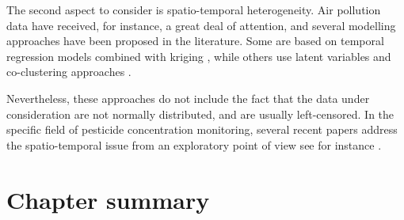 The second aspect to consider is spatio-temporal heterogeneity. Air pollution data have received, for instance, a great deal of attention, and several modelling approaches have been proposed in the literature. Some are based on temporal regression models combined with kriging \citep{sampson2011,lindstrom2014flexible}, while others use latent variables and co-clustering approaches \citep{bouveyron2021co}. 

Nevertheless, these approaches do not include the fact that the data under consideration are not normally distributed, and are usually left-censored. In the specific field of pesticide concentration monitoring, several recent papers address the spatio-temporal issue from an exploratory point of view see for instance \cite{masia2016,figueiredo2021spatio,aznar2017spatio}. 





\clearpage

\section{Chapter summary}

